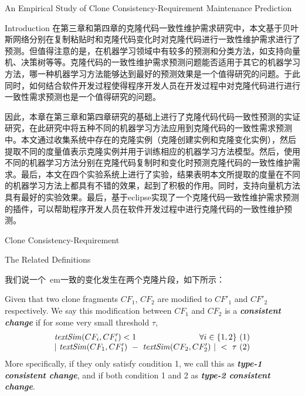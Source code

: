 
{An Empirical Study of Clone Consistency-Requirement Maintenance Prediction}


{Introduction}
在第三章和第四章的克隆代码一致性维护需求研究中，本文基于贝叶斯网络分别在复制粘贴时和克隆代码变化时对克隆代码进行一致性维护需求进行了预测。但值得注意的是，在机器学习领域中有较多的预测和分类方法，如支持向量机、决策树等等。克隆代码的一致性维护需求预测问题能否适用于其它的机器学习方法，哪一种机器学习方法能够达到最好的预测效果是一个值得研究的问题。于此同时，如何结合软件开发过程使得程序开发人员在开发过程中对克隆代码进行进行一致性需求预测也是一个值得研究的问题。

因此，本章在第三章和第四章研究的基础上进行了克隆代码代码一致性预测的实证研究，在此研究中将五种不同的机器学习方法应用到克隆代码的一致性需求预测中。本文通过收集系统中存在的克隆实例（克隆创建实例和克隆变化实例），然后提取不同的度量值表示克隆实例并用于训练相应的机器学习方法模型。然后，使用不同的机器学习方法分别在克隆代码复制时和变化时预测克隆代码的一致性维护需求。最后，本文在四个实验系统上进行了实验，结果表明本文所提取的度量在不同的机器学习方法上都具有不错的效果，起到了积极的作用。同时，支持向量机方法具有最好的实验效果。最后，基于eclipse实现了一个克隆代码一致性维护需求预测的插件，可以帮助程序开发人员在软件开发过程中进行克隆代码的一致性维护预测。

{Clone Consistency-Requirement}

{The Related Definitions}

我们说一个{\ em一致的变化}发生在两个克隆片段，如下所示：

\begin{definition}  
Given that two clone fragments $CF_1$, $CF_2$ are modified to $CF'_1$ and $CF'_2$ respectively. 
We say this modification between $CF_1$ and $CF_2$ is a {\em\bf consistent change\/} if for some very small threshold $\tau$, 
  \[
  \begin{array}[t]{lr}
    \mathit{textSim}(CF_i, CF'_i) < 1 & \forall i \in \{1,2\}~(1) \\
    \multicolumn{2}{c}{| ~\mathit{textSim}(CF_1,CF'_1)  ~-~ \mathit{textSim}(CF_2,CF'_2) ~| ~< ~ \tau~(2)}
  \end{array}
  \]
More specifically, if they only satisfy condition 1, we call this as {\bf \em type-1 consistent change}, and if both condition 1 and 2 as {\bf \em type-2 consistent change}.
\end{definition}

